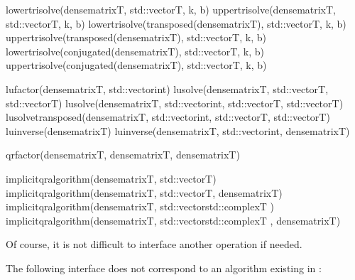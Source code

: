 \documentclass[a4paper,11pt,english]{sphinxmanual}
\begin{document}
\begin{sphinxVerbatim}[commandchars=\\\{\}]
lower\PYGZus{}tri\PYGZus{}solve(dense\PYGZus{}matrix\PYGZlt{}T\PYGZgt{}, std::vector\PYGZlt{}T\PYGZgt{}, k, b)
upper\PYGZus{}tri\PYGZus{}solve(dense\PYGZus{}matrix\PYGZlt{}T\PYGZgt{}, std::vector\PYGZlt{}T\PYGZgt{}, k, b)
lower\PYGZus{}tri\PYGZus{}solve(transposed(dense\PYGZus{}matrix\PYGZlt{}T\PYGZgt{}), std::vector\PYGZlt{}T\PYGZgt{}, k, b)
upper\PYGZus{}tri\PYGZus{}solve(transposed(dense\PYGZus{}matrix\PYGZlt{}T\PYGZgt{}), std::vector\PYGZlt{}T\PYGZgt{}, k, b)
lower\PYGZus{}tri\PYGZus{}solve(conjugated(dense\PYGZus{}matrix\PYGZlt{}T\PYGZgt{}), std::vector\PYGZlt{}T\PYGZgt{}, k, b)
upper\PYGZus{}tri\PYGZus{}solve(conjugated(dense\PYGZus{}matrix\PYGZlt{}T\PYGZgt{}), std::vector\PYGZlt{}T\PYGZgt{}, k, b)

lu\PYGZus{}factor(dense\PYGZus{}matrix\PYGZlt{}T\PYGZgt{}, std::vector\PYGZlt{}int\PYGZgt{})
lu\PYGZus{}solve(dense\PYGZus{}matrix\PYGZlt{}T\PYGZgt{}, std::vector\PYGZlt{}T\PYGZgt{}, std::vector\PYGZlt{}T\PYGZgt{})
lu\PYGZus{}solve(dense\PYGZus{}matrix\PYGZlt{}T\PYGZgt{}, std::vector\PYGZlt{}int\PYGZgt{}, std::vector\PYGZlt{}T\PYGZgt{},
         std::vector\PYGZlt{}T\PYGZgt{})
lu\PYGZus{}solve\PYGZus{}transposed(dense\PYGZus{}matrix\PYGZlt{}T\PYGZgt{}, std::vector\PYGZlt{}int\PYGZgt{}, std::vector\PYGZlt{}T\PYGZgt{},
         std::vector\PYGZlt{}T\PYGZgt{})
lu\PYGZus{}inverse(dense\PYGZus{}matrix\PYGZlt{}T\PYGZgt{})
lu\PYGZus{}inverse(dense\PYGZus{}matrix\PYGZlt{}T\PYGZgt{}, std::vector\PYGZlt{}int\PYGZgt{}, dense\PYGZus{}matrix\PYGZlt{}T\PYGZgt{})

qr\PYGZus{}factor(dense\PYGZus{}matrix\PYGZlt{}T\PYGZgt{}, dense\PYGZus{}matrix\PYGZlt{}T\PYGZgt{}, dense\PYGZus{}matrix\PYGZlt{}T\PYGZgt{})

implicit\PYGZus{}qr\PYGZus{}algorithm(dense\PYGZus{}matrix\PYGZlt{}T\PYGZgt{}, std::vector\PYGZlt{}T\PYGZgt{})
implicit\PYGZus{}qr\PYGZus{}algorithm(dense\PYGZus{}matrix\PYGZlt{}T\PYGZgt{}, std::vector\PYGZlt{}T\PYGZgt{},
                      dense\PYGZus{}matrix\PYGZlt{}T\PYGZgt{})
implicit\PYGZus{}qr\PYGZus{}algorithm(dense\PYGZus{}matrix\PYGZlt{}T\PYGZgt{}, std::vector\PYGZlt{}std::complex\PYGZlt{}T\PYGZgt{} \PYGZgt{})
implicit\PYGZus{}qr\PYGZus{}algorithm(dense\PYGZus{}matrix\PYGZlt{}T\PYGZgt{}, std::vector\PYGZlt{}std::complex\PYGZlt{}T\PYGZgt{} \PYGZgt{},
                      dense\PYGZus{}matrix\PYGZlt{}T\PYGZgt{})
\end{sphinxVerbatim}

Of course, it is not difficult to interface another operation if needed.

The following interface does not correspond to an algorithm existing in :
\end{document}
